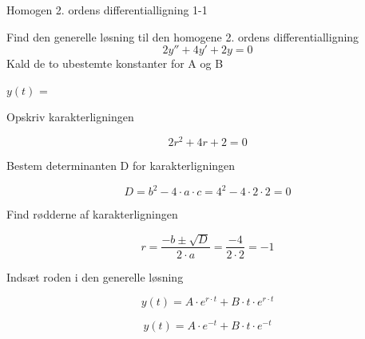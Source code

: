 \documentclass{article}
\begin{document}
\tableofcontents
\newpage


\begin{exercise}{Homogen 2. ordens differentialligning 1-1}

Find den generelle løsning til den homogene 2. ordens differentialligning
\[
2y'' + 4y' + 2y = 0
\]
Kald de to ubestemte konstanter for A og B

$y(t)$ = 


\hint

Opskriv karakterligningen

\hint

\[
2 r^2 + 4r + 2 = 0
\]


\hint

Bestem determinanten D for karakterligningen


\hint
\[
D = b^2 - 4 \cdot a \cdot c = 4^2 - 4 \cdot 2 \cdot 2 = 0
\]

\hint
Find rødderne af karakterligningen


\hint

\[
r = \frac{-b \pm \sqrt{D}}{2 \cdot a} = \frac{-4}{2 \cdot 2} = -1
\]

\hint

Indsæt roden i den generelle løsning

\hint
\[
y(t) = A \cdot e^{r \cdot t} + B \cdot t \cdot e^{r \cdot t}
\]

\hint

\[
y(t) = A \cdot e^{-t} + B \cdot t \cdot e^{-t}
\]


\end{exercise}

\newpage
\end{document}
